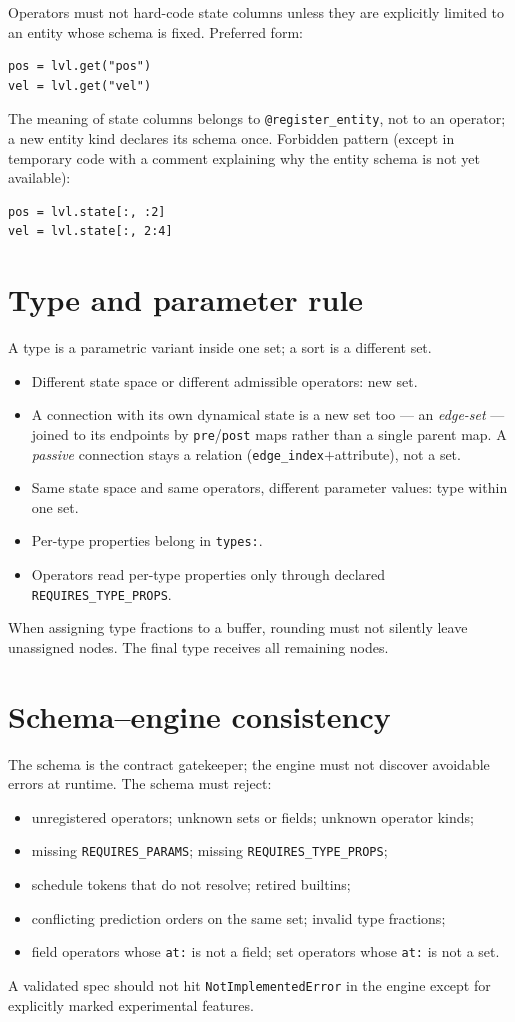 \documentclass[11pt]{article}
\newcommand{\code}[1]{\texttt{#1}}
\begin{document}
Operators must not hard-code state columns unless they are explicitly limited to an
entity whose schema is fixed. Preferred form:
\begin{lstlisting}[style=yaml]
pos = lvl.get("pos")
vel = lvl.get("vel")
\end{lstlisting}
The meaning of state columns belongs to \code{@register\_entity}, not to an
operator; a new entity kind declares its schema once. Forbidden pattern (except in
temporary code with a comment explaining why the entity schema is not yet
available):
\begin{lstlisting}[style=yaml]
pos = lvl.state[:, :2]
vel = lvl.state[:, 2:4]
\end{lstlisting}

\section{Type and parameter rule}

A type is a parametric variant inside one set; a sort is a different set.
\begin{itemize}\itemsep2pt
\item Different state space or different admissible operators: new set.
\item A connection with its own dynamical state is a new set too --- an
\emph{edge-set} --- joined to its endpoints by \code{pre}/\code{post} maps rather than
a single parent map. A \emph{passive} connection stays a relation
(\code{edge\_index}$+$attribute), not a set.
\item Same state space and same operators, different parameter values: type within
one set.
\item Per-type properties belong in \code{types:}.
\item Operators read per-type properties only through declared
\code{REQUIRES\_TYPE\_PROPS}.
\end{itemize}
When assigning type fractions to a buffer, rounding must not silently leave
unassigned nodes. The final type receives all remaining nodes.

\section{Schema--engine consistency}

The schema is the contract gatekeeper; the engine must not discover avoidable errors
at runtime. The schema must reject:
\begin{itemize}\itemsep2pt
\item unregistered operators; unknown sets or fields; unknown operator kinds;
\item missing \code{REQUIRES\_PARAMS}; missing \code{REQUIRES\_TYPE\_PROPS};
\item schedule tokens that do not resolve; retired builtins;
\item conflicting prediction orders on the same set; invalid type fractions;
\item field operators whose \code{at:} is not a field; set operators whose \code{at:}
is not a set.
\end{itemize}
A validated spec should not hit \code{NotImplementedError} in the engine except for
explicitly marked experimental features.
\end{document}

